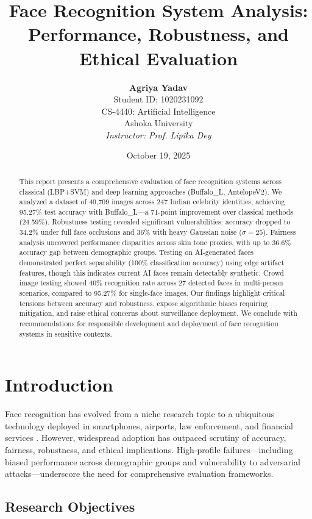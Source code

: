 \documentclass[11pt,a4paper]{article}
\title{
    \vspace{-1cm}
    \textbf{\color{primary}\LARGE Face Recognition System Analysis:}\\
    \vspace{0.3cm}
    \textbf{\color{primary}\Large Performance, Robustness, and Ethical Evaluation}
}
\author{
    \textbf{Agriya Yadav}\\
    Student ID: 1020231092\\
    \vspace{0.2cm}
    CS-4440: Artificial Intelligence\\
    Ashoka University\\
    \vspace{0.2cm}
    \textit{Instructor: Prof. Lipika Dey}
}
\date{October 19, 2025}
\begin{document}
\maketitle
\thispagestyle{empty}

\begin{abstract}
\noindent
This report presents a comprehensive evaluation of face recognition systems across classical (LBP+SVM) and deep learning approaches (Buffalo\_L, AntelopeV2). We analyzed a dataset of 40,709 images across 247 Indian celebrity identities, achieving 95.27\% test accuracy with Buffalo\_L—a 71-point improvement over classical methods (24.59\%). Robustness testing revealed significant vulnerabilities: accuracy dropped to 34.2\% under full face occlusions and 36\% with heavy Gaussian noise ($\sigma=25$). Fairness analysis uncovered performance disparities across skin tone proxies, with up to 36.6\% accuracy gap between demographic groups. Testing on AI-generated faces demonstrated perfect separability (100\% classification accuracy) using edge artifact features, though this indicates current AI faces remain detectably synthetic. Crowd image testing showed 40\% recognition rate across 27 detected faces in multi-person scenarios, compared to 95.27\% for single-face images. Our findings highlight critical tensions between accuracy and robustness, expose algorithmic biases requiring mitigation, and raise ethical concerns about surveillance deployment. We conclude with recommendations for responsible development and deployment of face recognition systems in sensitive contexts.
\end{abstract}

\newpage
\tableofcontents
\newpage

\section{Introduction}

Face recognition has evolved from a niche research topic to a ubiquitous technology deployed in smartphones, airports, law enforcement, and financial services \cite{deng2019arcface}. However, widespread adoption has outpaced scrutiny of accuracy, fairness, robustness, and ethical implications. High-profile failures—including biased performance across demographic groups \cite{buolamwini2018gender} and vulnerability to adversarial attacks—underscore the need for comprehensive evaluation frameworks.

\subsection{Research Objectives}
\end{document}
